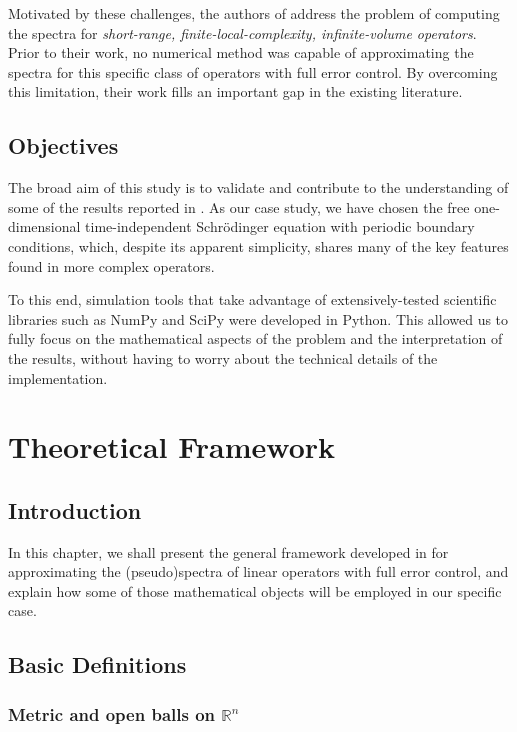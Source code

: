 \documentclass[11pt]{article}
\begin{document}
Motivated by these challenges, the authors of \cite{paulhege2025} address the problem of computing the spectra for \textit{short-range, finite-local-complexity, infinite-volume operators}. Prior to their work, no numerical method was capable of approximating the spectra for this specific class of operators with full error control. By overcoming this limitation, their work fills an important gap in the existing literature.

\subsection{Objectives}

The broad aim of this study is to validate and contribute to the understanding of some of the results reported in \cite{paulhege2025}. As our case study, we have chosen the free one-dimensional time-independent Schrödinger equation with periodic boundary conditions, which, despite its apparent simplicity, shares many of the key features found in more complex operators.

To this end, simulation tools that take advantage of extensively-tested scientific libraries such as NumPy and SciPy were developed in Python. This allowed us to fully focus on the mathematical aspects of the problem and the interpretation of the results, without having to worry about the technical details of the implementation.

\newpage

\section{Theoretical Framework}

\subsection{Introduction}

In this chapter, we shall present the general framework developed in \cite{paulhege2025} for approximating the (pseudo)spectra of linear operators with full error control, and explain how some of those mathematical objects will be employed in our specific case.

\subsection{Basic Definitions}

\subsubsection{Metric and open balls on $\mathbb{R}^n$}
\end{document}
